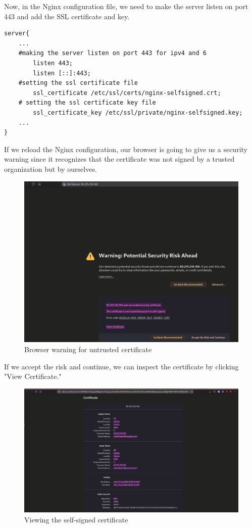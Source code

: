 \documentclass[a4paper]{article}
\newcommand{\abc}{\hfill \break}
\begin{document}
Now, in the Nginx configuration file, we need to make the server listen on port 443 and add the SSL certificate and key.
\begin{lstlisting}
server{
	...
	#making the server listen on port 443 for ipv4 and 6
        listen 443;
        listen [::]:443;
	#setting the ssl certificate file
        ssl_certificate /etc/ssl/certs/nginx-selfsigned.crt;
	# setting the ssl certificate key file
        ssl_certificate_key /etc/ssl/private/nginx-selfsigned.key;
	...
}
\end{lstlisting}
\newpage
If we reload the Nginx configuration, our browser is going to give us a security warning since it recognizes that the certificate was not signed by a trusted organization but by ourselves. \begin{figure}[!htbp]
	\includegraphics[scale=0.25]{images/unseccert.png}
	\centering
	\caption{Browser warning for untrusted certificate}
\end{figure}\abc
If we accept the risk and continue, we can inspect the certificate by clicking "View Certificate."
\begin{figure}[!htbp]
	\includegraphics[scale=0.2]{images/selfcert.png}
	\centering
	\caption{Viewing the self-signed certificate}
\end{figure}
\end{document}
